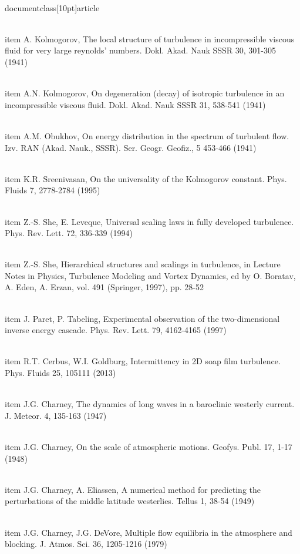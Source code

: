 \\documentclass[10pt]{article}
\begin{document}
{{{{{  \\item A. Kolmogorov, The local structure of turbulence in incompressible viscous fluid for very large reynolds' numbers. Dokl. Akad. Nauk SSSR 30, 301-305 (1941)

  \\item A.N. Kolmogorov, On degeneration (decay) of isotropic turbulence in an incompressible viscous fluid. Dokl. Akad. Nauk SSSR 31, 538-541 (1941)

  \\item A.M. Obukhov, On energy distribution in the spectrum of turbulent flow. Izv. RAN (Akad. Nauk., SSSR). Ser. Geogr. Geofiz., 5 453-466 (1941)

  \\item K.R. Sreenivasan, On the universality of the Kolmogorov constant. Phys. Fluids 7, 2778-2784 (1995)

  \\item Z.-S. She, E. Leveque, Universal scaling laws in fully developed turbulence. Phys. Rev. Lett. 72, 336-339 (1994)

  \\item Z.-S. She, Hierarchical structures and scalings in turbulence, in Lecture Notes in Physics, Turbulence Modeling and Vortex Dynamics, ed by O. Boratav, A. Eden, A. Erzan, vol. 491 (Springer, 1997), pp. 28-52

  \\item J. Paret, P. Tabeling, Experimental observation of the two-dimensional inverse energy cascade. Phys. Rev. Lett. 79, 4162-4165 (1997)

  \\item R.T. Cerbus, W.I. Goldburg, Intermittency in 2D soap film turbulence. Phys. Fluids 25, 105111 (2013)

  \\item J.G. Charney, The dynamics of long waves in a baroclinic westerly current. J. Meteor. 4, 135-163 (1947)

  \\item J.G. Charney, On the scale of atmospheric motions. Geofys. Publ. 17, 1-17 (1948)

  \\item J.G. Charney, A. Eliassen, A numerical method for predicting the perturbations of the middle latitude westerlies. Tellus 1, 38-54 (1949)

  \\item J.G. Charney, J.G. DeVore, Multiple flow equilibria in the atmosphere and blocking. J. Atmos. Sci. 36, 1205-1216 (1979)

}}}}}
\end{document}
